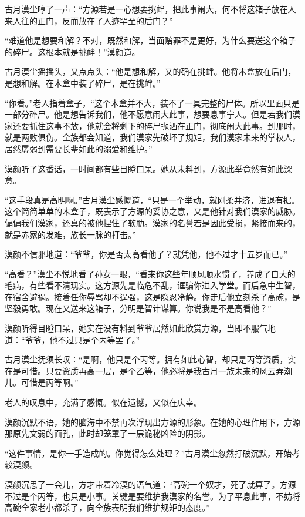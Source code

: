 \begin{this_body}
古月漠尘哼了一声：“方源若是一心想要挑衅，把此事闹大，何不将这箱子放在人来人往的正门，反而放在了人迹罕至的后门？”

“难道他是想要和解？不对，既然和解，当面赔罪不是更好，为什么要送这个箱子的碎尸。这根本就是挑衅！”漠颜道。

古月漠尘摇摇头，又点点头：“他是想和解，又的确在挑衅。他将木盒放在后门，是想和解。在木盒中装了碎尸，是在挑衅。”

“你看。”老人指着盒子，“这个木盒并不大，装不了一具完整的尸体。所以里面只是一部分碎尸。他是想告诉我们，他不愿意闹大此事，想要息事宁人。但是若我们漠家还要抓住这事不放，他就会将剩下的碎尸抛洒在正门，彻底闹大此事。到那时，就是两败俱伤。全族都会知道，我们漠家先破坏了规矩，我们漠家未来的掌权人，居然孱弱到需要长辈如此的溺爱和维护。”

漠颜听了这番话，一时间都有些目瞪口呆。她从未料到，方源此举竟然有如此深意。

“这手段真是高明啊。”古月漠尘感慨道，“只是一个举动，就刚柔并济，进退有据。这个简简单单的木盒子，既表示了方源的妥协之意，又是他针对我们漠家的威胁。偏偏我们漠家，还真的被他捏住了软肋。漠家的名誉若是因此受损，紧接而来的，就是赤家的发难，族长一脉的打击。”

漠颜不信邪地道：“爷爷，你是否太高看他了？就凭他，他不过才十五岁而已。”

“高看？”漠尘不悦地看了孙女一眼，“看来你这些年顺风顺水惯了，养成了自大的毛病，有些看不清现实。这方源先是临危不乱，诓骗你进入学堂。而后急中生智，在宿舍避祸。接着任你辱骂却不逞强，这是隐忍冷静。你走后他立刻杀了高碗，是坚毅勇敢。现在又送来这箱子，分明是智计谋算。你说我是不是高看他？”

漠颜听得目瞪口呆，她实在没有料到爷爷居然如此欣赏方源，当即不服气地道：“爷爷，他不过只是个丙等罢了。”

古月漠尘抚须长叹：“是啊，他只是个丙等。拥有如此心智，却只是丙等资质，实在是可惜。只要资质再高一层，是个乙等，他必将是我古月一族未来的风云弄潮儿。可惜是丙等啊。”

老人的叹息中，充满了感慨。似在遗憾，又似在庆幸。

漠颜沉默不语，她的脑海中不禁再次浮现出方源的形象。在她的心理作用下，方源那原先文弱的面孔，此时却笼罩了一层诡秘凶险的阴影。

“这件事情，是你一手造成的。你觉得怎么处理？”古月漠尘忽然打破沉默，开始考较漠颜。

漠颜沉思了一会儿，方才带着冷漠的语气道：“高碗一个奴才，死了就算了。方源不过是个丙等，也只是小事。关键是要维护我漠家的名誉。为了平息此事，不妨将高碗全家老小都杀了，向全族表明我们维护规矩的态度。”


\end{this_body}
